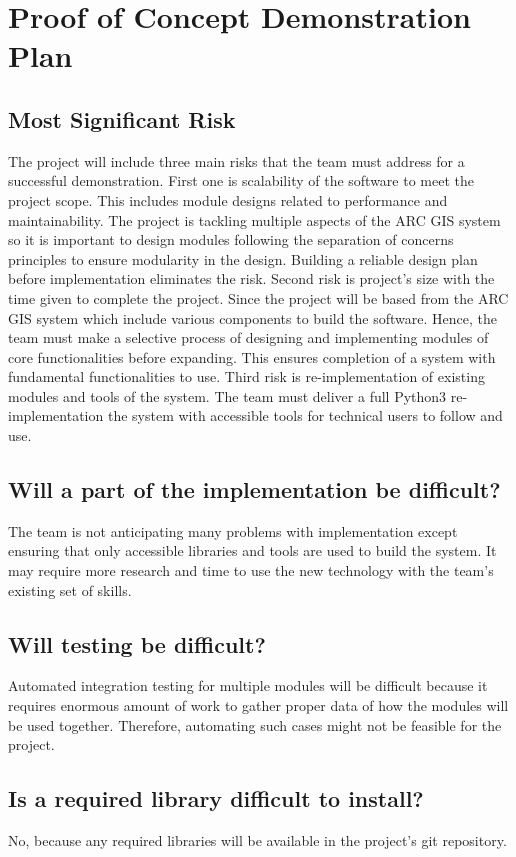 \documentclass{article}
\begin{document}
\section{Proof of Concept Demonstration Plan} %

\subsection{Most Significant Risk}
The project will include three main risks that the team must address for a successful demonstration. First one is scalability of the software to meet the project scope. This includes module designs related to performance and maintainability. The project is tackling multiple aspects of the ARC GIS system so it is important to design modules following the separation of concerns principles to ensure modularity in the design. Building a reliable design plan before implementation eliminates the risk. Second risk is project's size with the time given to complete the project. Since the project will be based from the ARC GIS system which include various components to build the software. Hence, the team must make a selective process of designing and implementing modules of core functionalities before expanding. This ensures completion of a system with fundamental functionalities to use. Third risk is re-implementation of existing modules and tools of the system. The team must deliver a full Python3 re-implementation the system with accessible tools for technical users to follow and use. 

\subsection{Will a part of the implementation be difficult?}
The team is not anticipating many problems with implementation except ensuring that only accessible libraries and tools are used to build the system. It may require more research and time to use the new technology with the team's existing set of skills. 

\subsection{Will testing be difficult?}
Automated integration testing for multiple modules will be difficult because it requires enormous amount of work to gather proper data of how the modules will be used together. Therefore, automating such cases might not be feasible for the project.

\subsection{Is a required library difficult to install?}
No, because any required libraries will be available in the project's git repository.
\end{document}
